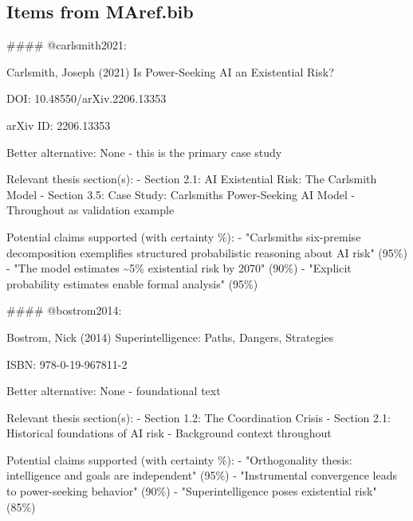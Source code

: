 \documentclass[
  11pt,
  letterpaper,
]{book}
\newenvironment{Shaded}{\begin{snugshade}}{\end{snugshade}}
\newcommand{\FunctionTok}[1]{\textcolor[rgb]{0.28,0.35,0.67}{#1}}
\newcommand{\InformationTok}[1]{\textcolor[rgb]{0.37,0.37,0.37}{#1}}
\begin{document}
\subsection{Items from MAref.bib}\label{items-from-maref.bib}

\begin{Shaded}
\begin{Highlighting}[]

\FunctionTok{\#\#\#\# \textasciigrave{}@carlsmith2021\textasciigrave{}: }

\InformationTok{    Carlsmith, Joseph (2021)}
\InformationTok{    Is Power{-}Seeking AI an Existential Risk?}

\InformationTok{    DOI: 10.48550/arXiv.2206.13353}

\InformationTok{    arXiv ID: 2206.13353}

\InformationTok{    Better alternative: None {-} this is the primary case study}

\InformationTok{    Relevant thesis section(s): }
\InformationTok{    {-} Section 2.1: AI Existential Risk: The Carlsmith Model}
\InformationTok{    {-} Section 3.5: Case Study: Carlsmith\textquotesingle{}s Power{-}Seeking AI Model}
\InformationTok{    {-} Throughout as validation example}

\InformationTok{    Potential claims supported (with certainty \%):}
\InformationTok{    {-} "Carlsmith\textquotesingle{}s six{-}premise decomposition exemplifies structured probabilistic reasoning about AI risk" (95\%)}
\InformationTok{    {-} "The model estimates \textasciitilde{}5\% existential risk by 2070" (90\%)}
\InformationTok{    {-} "Explicit probability estimates enable formal analysis" (95\%)}

\FunctionTok{\#\#\#\# \textasciigrave{}@bostrom2014\textasciigrave{}: }

\InformationTok{    Bostrom, Nick (2014)}
\InformationTok{    Superintelligence: Paths, Dangers, Strategies}

\InformationTok{    ISBN: 978{-}0{-}19{-}967811{-}2}

\InformationTok{    Better alternative: None {-} foundational text}

\InformationTok{    Relevant thesis section(s):}
\InformationTok{    {-} Section 1.2: The Coordination Crisis}
\InformationTok{    {-} Section 2.1: Historical foundations of AI risk}
\InformationTok{    {-} Background context throughout}

\InformationTok{    Potential claims supported (with certainty \%):}
\InformationTok{    {-} "Orthogonality thesis: intelligence and goals are independent" (95\%)}
\InformationTok{    {-} "Instrumental convergence leads to power{-}seeking behavior" (90\%)}
\InformationTok{    {-} "Superintelligence poses existential risk" (85\%)}


\end{Highlighting}
\end{Shaded}
\end{document}
